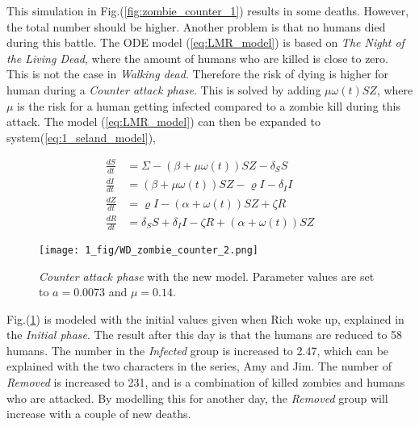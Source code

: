 \documentclass[%
twoside,                 %
final,                   %
chapterprefix=true,      %
open=right               %
10pt]{book}
\begin{document}
This simulation in Fig.(\ref{fig:zombie_counter_1}) results in some deaths. However, the total number should be higher. Another problem is that no humans died during this battle. The ODE model (\ref{eq:LMR_model}) is based on \emph{The Night of the Living Dead}, where the amount of humans who are killed is close to zero. This is not the case in \emph{Walking dead}. Therefore the risk of dying is higher for human during a \emph{Counter attack phase}. This is solved by adding $\mu \omega (t) SZ$, where $\mu$ is the risk for a human getting infected compared to a zombie kill during this attack. The model (\ref{eq:LMR_model}) can then be expanded to system(\ref{eq:1_seland_model}),

\begin{equation} \label{eq:1_seland_model}
	\begin{aligned} 
	\frac{dS}{dt} &= \Sigma -(\beta+\mu \omega(t))SZ - \delta_SS \\
	\frac{dI}{dt} &= (\beta+\mu \omega(t))SZ - \varrho I - \delta_II\\
	\frac{dZ}{dt} &= \varrho I- (\alpha+\omega(t))SZ + \zeta R\\
	\frac{dR}{dt} &= \delta_SS +\delta_II -\zeta R + (\alpha+\omega(t))SZ 
	\end{aligned}
\end{equation}


\begin{figure}[ht]
  \centerline{\texttt{[image: 1\_fig/WD\_zombie\_counter\_2.png]}}
  \caption{
  \label{fig:zombie_counter_2} \emph{Counter attack phase} with the new model. Parameter values are set to $a=0.0073$ and $\mu=0.14$.
  }
\end{figure}


Fig.(\ref{fig:zombie_counter_2}) is modeled with the initial values given when Rich woke up, explained in the \emph{Initial phase}. The result after this day is that the humans are reduced to 58 humans. The number in the \emph{Infected} group is increased to 2.47, which can be explained with the two characters in the series, Amy and Jim. The number of \emph{Removed} is increased to 231, and is a combination of killed zombies and humans who are attacked. By modelling this for another day, the \emph{Removed} group will increase with a couple of new deaths. 


\vspace{3mm}




\vspace{3mm}
\end{document}
